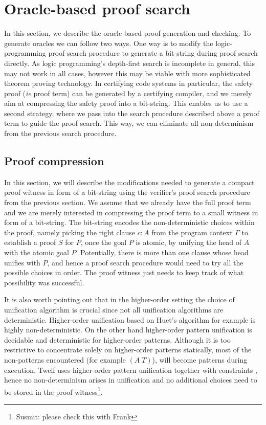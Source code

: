\documentclass{acmconf}
\begin{document}
\section{Oracle-based proof search}
\label{sec:oracles}

In this section, we describe the oracle-based proof generation and
checking. To generate oracles we can follow two ways. One way is to
modify the logic-programming proof search procedure to generate a
bit-string during proof search directly. As logic programming's
depth-first search is incomplete in general, this may not work in all
cases, however this may be viable with more sophisticated theorem proving
technology. In certifying code systems in particular, the safety proof
({\em ie} proof term) can be generated by a certifying compiler, and
we merely aim at compressing the safety proof into a bit-string. This
enables us to use a second strategy, where we pass into the search procedure
described above a proof term to guide the proof search. This way, we
can eliminate all non-determinism from the previous search procedure.

\subsection{Proof compression}

In this section, we will describe the modifications needed to generate
a compact proof witness in form of a bit-string using the verifier's
proof search procedure from the previous section. We assume that we
already have the full proof term and we are merely interested in
compressing the proof term to a small witness in form of a bit-string.
The bit-string encodes the non-deterministic choices within the proof,
namely picking the right clause $c:A$ from the program context
$\Gamma$ to establish a proof $S$ for $P$, once the goal $P$ is
atomic, by unifying the head of $A$ with the atomic goal
$P$. Potentially, there is more than one clause whose head unifies
with $P$, and hence a proof search procedure would need to try all the
possible choices in order. The proof witness just needs to keep track
of what possibility was successful.

It is also worth pointing out that in the higher-order setting the
choice of unification algorithm is crucial since not all unification
algorithms are deterministic. Higher-order unification based on Huet's
algorithm \cite{Huet75} for example is highly non-deterministic. On the
other hand higher-order pattern unification \cite{Miller91jlc} is
decidable and deterministic for higher-order patterns. Although it is too restrictive to
concentrate solely on higher-order patterns statically, most of the
non-patterns encountered (for example $(A\;T)$), will become patterns
during execution. Twelf uses higher-order pattern unification together
with constraints \cite{Pfenning91lf}, hence no non-determinism arises
in unification and no additional choices need to be stored in the proof
witness\footnote{Susmit: please check this with Frank}. 
\end{document}
